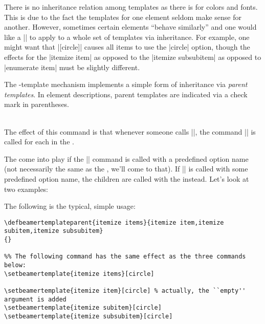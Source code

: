 There is no inheritance relation among templates as there is for colors and fonts. This is due to the fact the templates for one element seldom make sense for another. However, sometimes certain elements ``behave similarly'' and one would like a |\setbeamertemplate| to apply to a whole set of templates via inheritance. For example, one might want that |[circle]| causes all items to use the |circle| option, though the effects for the |itemize item| as opposed to the |itemize subsubitem| as opposed to |enumerate item| must be slightly different.

The \beamer-template mechanism implements a simple form of inheritance via \emph{parent templates}. In element descriptions, parent templates are indicated via a check mark in parentheses.

\begin{command}{\\ }
  The effect of this command is that whenever someone calls ||, the command || is called for each  in the .

  The  come into play if the |\setbeamertemplate| command is called with a predefined option name (not necessarily the same as the , we'll come to that). If |\setbeamertemplate| is called with some predefined option name, the children are called with the  instead. Let's look at two examples:

  \example
  The following is the typical, simple usage:

\begin{verbatim}
\defbeamertemplateparent{itemize items}{itemize item,itemize subitem,itemize subsubitem}
{}

%% The following command has the same effect as the three commands below:
\setbeamertemplate{itemize items}[circle]

\setbeamertemplate{itemize item}[circle] % actually, the ``empty'' argument is added
\setbeamertemplate{itemize subitem}[circle]
\setbeamertemplate{itemize subsubitem}[circle]
\end{verbatim}


\end{command}
